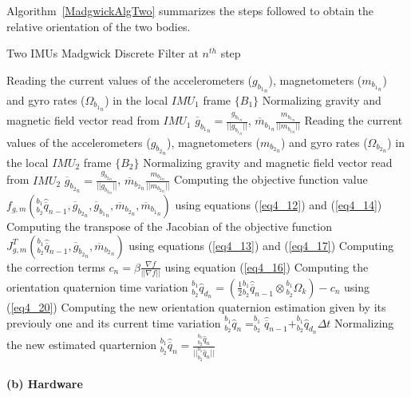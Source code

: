 Algorithm~\ref{MadgwickAlgTwo} summarizes the steps followed to obtain the relative orientation of the two bodies.

\begin{algorithm}
\caption{Two IMUs Madgwick Discrete Filter at $n^{th}$ step}
\begin{algorithmic}[1]
\label{MadgwickAlgTwo}
\STATE Reading the current values of the accelerometers ($g_{{b_1}_n}$), magnetometers ($m_{{b_1}_n}$) and gyro rates ($\Omega_{{b_1}_n}$) in the local $IMU_1$ frame $\{B_1\}$
\STATE Normalizing gravity and magnetic field vector read from $IMU_1$ $\overline{g}_{{b_1}_n} = \frac{g_{{b_1}_n}}{\vert \vert g_{{b_1}_n} \vert \vert}$, $\overline{m}_{{b_1}_n} \frac{m_{{b_1}_n}}{\vert \vert m_{{b_1}_n} \vert \vert}$
\STATE Reading the current values of the accelerometers ($g_{{b_2}_n}$), magnetometers ($m_{{b_2}_n}$) and gyro rates ($\Omega_{{b_2}_n}$) in the local $IMU_2$ frame $\{B_2\}$
\STATE Normalizing gravity and magnetic field vector read from $IMU_2$ $\overline{g}_{{b_2}_n} = \frac{g_{{b_2}_n}}{\vert \vert g_{{b_2}_n} \vert \vert}$, $\overline{m}_{{b_2}_n} \frac{m_{{b_2}_n}}{\vert \vert m_{{b_2}_n} \vert \vert}$
\STATE Computing the objective function value $f_{g,m}({^{b_1}_{b_2}\hat{\overline{q}}_{n-1}},\overline{g}_{{b_2}_n},\overline{g}_{{b_1}_n},\overline{m}_{{b_2}_n},\overline{m}_{{b_1}_n})$ using equations (\ref{eq4_12}) and (\ref{eq4_14})
\STATE Computing the transpose of the Jacobian of the objective function $J^T_{g,m}(^{b_1}_{b_2}\hat{\overline{q}}_{n-1},\overline{g}_{{b_2}_n},\overline{m}_{{b_2}_n})$ using equations (\ref{eq4_13}) and (\ref{eq4_17})
\STATE Computing the correction terms $c_n =  \beta \frac{\nabla f}{\vert \vert \nabla f \vert \vert}$ using equation (\ref{eq4_16})
\STATE Computing the orientation quaternion time variation $^{b_1}_{b_2} \hat{q}_{d_n} =  (\frac{1}{2} {^{b_1}_{b_2}\hat{\overline{q}}_{n-1}} \otimes {^{b_1}_{b_2} \Omega_k}) - c_n$ using (\ref{eq4_20})
\STATE Computing the new orientation quaternion estimation given by its previouly one and its current time variation $^{b_1}_{b_2} \hat{q}_n = ^{b_1}_{b_2}\hat{\overline{q}}_{n-1} + ^{b_1}_{b_2} \hat{q}_{d_n} \Delta t$
\STATE Normalizing the new estimated quarternion $^{b_1}_{b_2} \hat{\overline{q}}_n = \frac{^{b_1}_{b_2} \hat{q}_n}{\vert \vert ^{b_1}_{b_2} \hat{q}_n \vert \vert}$
\end{algorithmic}
\end{algorithm}

\paragraph{(b) Hardware}

